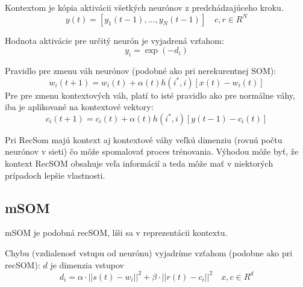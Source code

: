 Kontextom je kópia aktivácii všetkých neurónov z predchádzajúceho kroku.
\begin{equation}
	y(t) = [y_1(t-1), ..., y_{N}(t-1)]  \quad c, r \in R^{N}
\end{equation}

Hodnota aktivácie pre určitý neurón je vyjadrená vzťahom:
\begin{equation}
	y_i = \exp(-d_i)
\end{equation}

Pravidlo pre zmenu váh neurónov (podobné ako pri nerekurentnej SOM):
\begin{equation}
	w_i(t + 1) = w_i(t) + \alpha(t)h(i^*, i)[x(t) - w_i(t)]
\end{equation}
Pre pre zmenu kontextových váh, platí to isté pravidlo ako pre normálne váhy, iba je aplikované 
na kontextové vektory:
\begin{equation}
	c_i(t + 1) = c_i(t) + \alpha(t)h(i^*, i)[y(t - 1) - c_i(t)]
\end{equation}

Pri RecSom majú kontext aj kontextové váhy veľkú dimenziu (rovnú počtu neurónov v sieti) čo môže spomalovať
proces trénovania.
Výhodou môže byť, že kontext RecSOM obsahuje veľa informácií a teda môže mať v niektorých prípadoch
lepšie vlastnosti. 


\subsection{mSOM}
mSOM je podobná recSOM, líši sa v reprezentácii kontextu.

Chybu (vzdialenosť vstupu od neurónu) vyjadríme vzťahom (podobne ako pri recSOM):
$d$ je dimenzia vstupov
\begin{equation}
	d_i = \alpha \cdot ||s(t) - w_i||^{2} + \beta \cdot ||r(t) - c_i||^{2} \quad x, c \in R^{d}
\end{equation}

